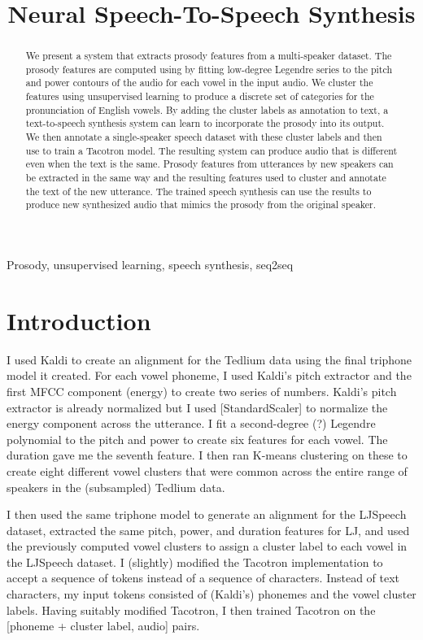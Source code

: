 \documentclass{article}
\title{Neural Speech-To-Speech Synthesis}
\begin{document}
%
\maketitle
%
\begin{abstract}
We present a system that extracts prosody features from a multi-speaker dataset.
The prosody features are computed using by fitting low-degree Legendre series to the pitch and power contours of the audio for each vowel in the input audio.
We cluster the features using unsupervised learning to produce a discrete set of categories for the pronunciation of English vowels.
By adding the cluster labels as annotation to text, a text-to-speech synthesis system can learn to incorporate the prosody into its output.
We then annotate a single-speaker speech dataset with these cluster labels and then use to train a Tacotron model.
The resulting system can produce audio that is different even when the text is the same.
Prosody features from utterances by new speakers can be extracted in the same way and the resulting features used to cluster and annotate the text of the new utterance.
The trained speech synthesis can use the results to produce new synthesized audio that mimics the prosody from the original speaker.
\end{abstract}
%
\begin{keywords}
Prosody, unsupervised learning, speech synthesis, seq2seq
\end{keywords}
%
\section{Introduction}
\label{sec:intro}

I used Kaldi \cite{Povey_ASRU2011} to create an alignment for the Tedlium data using the final triphone model it created. For each vowel phoneme, I used Kaldi's pitch extractor and the first MFCC component (energy) to create two series of numbers. Kaldi's pitch extractor is already normalized but I used [StandardScaler] to normalize the energy component across the utterance. I fit a second-degree (?) Legendre polynomial to the pitch and power to create six features for each vowel. The duration gave me the seventh feature. I then ran K-means clustering on these to create eight different vowel clusters that were common across the entire range of speakers in the (subsampled) Tedlium data.

I then used the same triphone model to generate an alignment for the LJSpeech dataset, extracted the same pitch, power, and duration features for LJ, and used the previously computed vowel clusters to assign a cluster label to each vowel in the LJSpeech dataset. I (slightly) modified the Tacotron implementation to accept a sequence of tokens instead of a sequence of characters. Instead of text characters, my input tokens consisted of (Kaldi's) phonemes and the vowel cluster labels. Having suitably modified Tacotron, I then trained Tacotron on the [phoneme + cluster label, audio] pairs.
\end{document}
